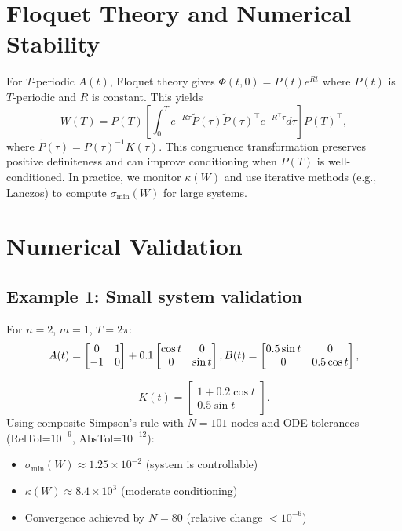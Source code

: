 \documentclass[5p,times]{elsarticle} %
\def\Ktil{K}%
\def\Acal{A}%
\newcommand{\Ktil}{\widetilde{K}}
\newcommand{\Acal}{\mathcal{A}}
\begin{document}
\section{Floquet Theory and Numerical Stability}
For \(T\)-periodic \(\Acal(t)\), Floquet theory gives \(\Phi(t,0)=P(t)e^{Rt}\) where \(P(t)\) is \(T\)-periodic and \(R\) is constant. This yields
\begin{equation}
W(T)=P(T)\left[\int_0^T e^{-R\tau}\widetilde{P}(\tau)\widetilde{P}(\tau)^\top e^{-R^\top\tau}d\tau\right]P(T)^\top,
\end{equation}
where \(\widetilde{P}(\tau)=P(\tau)^{-1}\Ktil(\tau)\). This congruence transformation preserves positive definiteness and can improve conditioning when \(P(T)\) is well-conditioned. In practice, we monitor \(\kappa(W)\) and use iterative methods (e.g., Lanczos) to compute \(\sigma_{\min}(W)\) for large systems.

\section{Numerical Validation}
\subsection{Example 1: Small system validation}
\begin{sloppypar}
For \(n=2\), \(m=1\), \(T=2\pi\):
\[
A(t)=\begin{bmatrix}0&1\\-1&0\end{bmatrix}+0.1\begin{bmatrix}\cos t&0\\0&\sin t\end{bmatrix},\;\\
B(t)=\begin{bmatrix}0.5\sin t&0\\0&0.5\cos t\end{bmatrix},
\]
\end{sloppypar}

\[
K(t)=\begin{bmatrix}1+0.2\cos t \\ 0.5\sin t\end{bmatrix}.
\]
Using composite Simpson's rule with \(N=101\) nodes and ODE tolerances (RelTol=\(10^{-9}\), AbsTol=\(10^{-12}\)):
\begin{itemize}
\item \(\sigma_{\min}(W)\approx 1.25\times 10^{-2}\) (system is controllable)
\item \(\kappa(W)\approx 8.4\times 10^{3}\) (moderate conditioning)
\item Convergence achieved by \(N=80\) (relative change \(<10^{-6}\))
\end{itemize}
\end{document}
